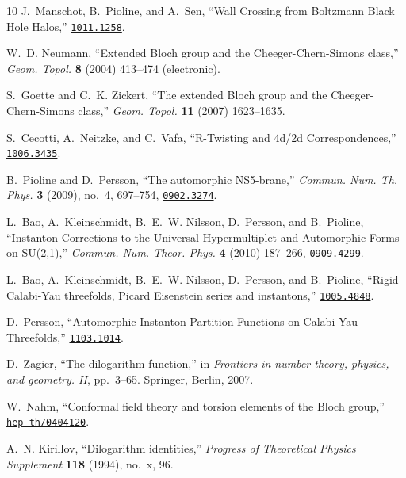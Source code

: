 \documentclass[12pt,reqno]{article}
\numberwithin{equation}{section}
\numberwithin{equation}{section}
\begin{document}
\begin{thebibliography}{10}
J.~Manschot, B.~Pioline, and A.~Sen, ``{Wall Crossing from Boltzmann Black Hole
  Halos},''
\href{http://www.arXiv.org/abs/1011.1258}{{\tt 1011.1258}}.

W.~D. Neumann, ``Extended {B}loch group and the {C}heeger-{C}hern-{S}imons
  class,'' {\em Geom. Topol.} {\bf 8} (2004) 413--474 (electronic).

S.~Goette and C.~K. Zickert, ``The extended {B}loch group and the
  {C}heeger-{C}hern-{S}imons class,'' {\em Geom. Topol.} {\bf 11} (2007)
  1623--1635.

S.~Cecotti, A.~Neitzke, and C.~Vafa, ``{R-Twisting and 4d/2d
  Correspondences},''
\href{http://www.arXiv.org/abs/1006.3435}{{\tt 1006.3435}}.

B.~Pioline and D.~Persson, ``{The automorphic NS5-brane},'' {\em Commun. Num.
  Th. Phys.} {\bf 3} (2009), no.~4, 697--754,
\href{http://www.arXiv.org/abs/0902.3274}{{\tt 0902.3274}}.

L.~Bao, A.~Kleinschmidt, B.~E.~W. Nilsson, D.~Persson, and B.~Pioline,
  ``{Instanton Corrections to the Universal Hypermultiplet and Automorphic
  Forms on SU(2,1)},'' {\em Commun. Num. Theor. Phys.} {\bf 4} (2010) 187--266,
\href{http://www.arXiv.org/abs/0909.4299}{{\tt 0909.4299}}.

L.~Bao, A.~Kleinschmidt, B.~E.~W. Nilsson, D.~Persson, and B.~Pioline, ``{Rigid
  Calabi-Yau threefolds, Picard Eisenstein series and instantons},''
\href{http://www.arXiv.org/abs/1005.4848}{{\tt 1005.4848}}.

D.~Persson, ``{Automorphic Instanton Partition Functions on Calabi-Yau
  Threefolds},'' \href{http://www.arXiv.org/abs/1103.1014}{{\tt 1103.1014}}.

D.~Zagier, ``The dilogarithm function,'' in {\em Frontiers in number theory,
  physics, and geometry. {II}}, pp.~3--65.
\newblock Springer, Berlin, 2007.

W.~Nahm, ``{Conformal field theory and torsion elements of the Bloch group},''
\href{http://www.arXiv.org/abs/hep-th/0404120}{{\tt hep-th/0404120}}.

A.~N. Kirillov, ``Dilogarithm identities,'' {\em Progress of Theoretical
  Physics Supplement} {\bf 118} (1994), no.~x, 96.


\end{thebibliography}
\end{document}

